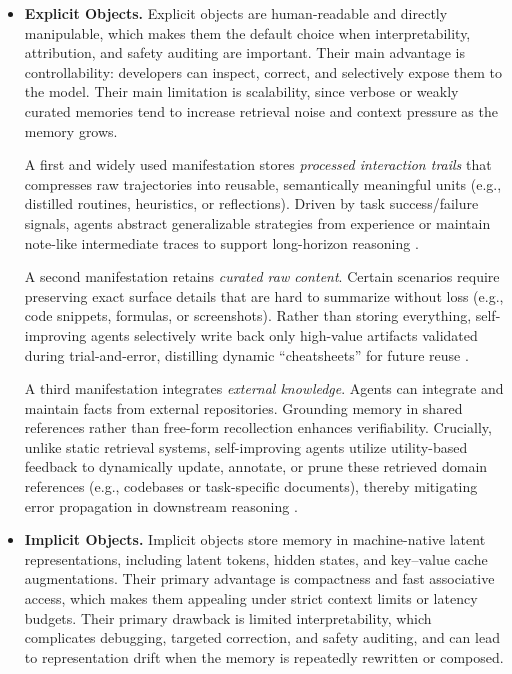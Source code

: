 \begin{itemize}[leftmargin=*]
    \item \textbf{Explicit Objects.}
    Explicit objects are human-readable and directly manipulable, which makes them the default choice when interpretability, attribution, and safety auditing are important. Their main advantage is controllability: developers can inspect, correct, and selectively expose them to the model. Their main limitation is scalability, since verbose or weakly curated memories tend to increase retrieval noise and context pressure as the memory grows.

    A first and widely used manifestation stores \textit{processed interaction trails} that compresses raw trajectories into reusable, semantically meaningful units (e.g., distilled routines, heuristics, or reflections). Driven by task success/failure signals, agents abstract generalizable strategies from experience or maintain note-like intermediate traces to support long-horizon reasoning \citep{wang2024agentworkflowmemory, ouyang2025reasoningbankscalingagentselfevolving, lanchantin2023learningreasonmemorizeselfnotes, lee2024humaninspiredreadingagentgist, long2025seeinglisteningrememberingreasoning}.


    A second manifestation retains \textit{curated raw content}. Certain scenarios require preserving exact surface details that are hard to summarize without loss (e.g., code snippets, formulas, or screenshots). Rather than storing everything, self-improving agents selectively write back only high-value artifacts validated during trial-and-error, distilling dynamic ``cheatsheets'' for future reuse \citep{zhao2024expel, suzgun2025dynamiccheatsheettesttimelearning}.

    A third manifestation integrates \textit{external knowledge}. Agents can integrate and  maintain facts from external repositories. Grounding memory in shared references rather than free-form recollection  enhances verifiability. Crucially, unlike static retrieval systems, self-improving agents utilize utility-based feedback to dynamically update, annotate, or prune these retrieved domain references (e.g., codebases or task-specific documents), thereby mitigating error propagation in downstream reasoning \citep{tran2025primeplanningretrievalintegratedmemory, zhang-etal-2024-codeagent, peng2023checkfactstryagain}.


    \item \textbf{Implicit Objects.} Implicit objects store memory in machine-native latent representations, including latent tokens, hidden states, and key--value cache augmentations. Their primary advantage is compactness and fast associative access, which makes them appealing under strict context limits or latency budgets. Their primary drawback is limited interpretability, which complicates debugging, targeted correction, and safety auditing, and can lead to representation drift when the memory is repeatedly rewritten or composed.



\end{itemize}
